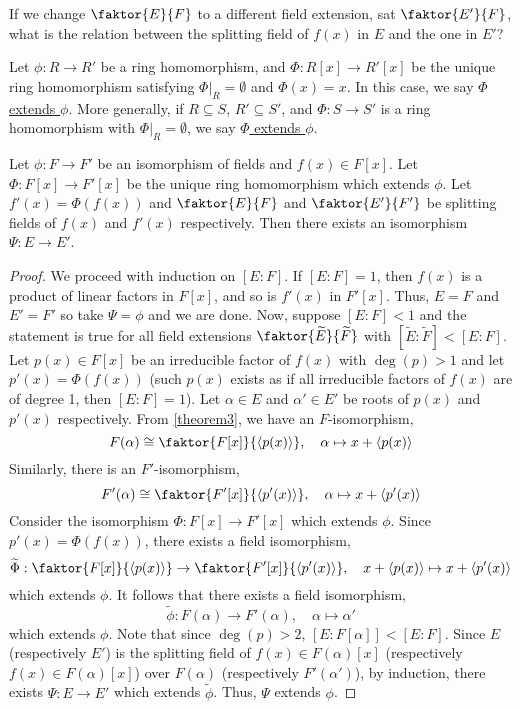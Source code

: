 \documentclass[11pt]{article}
\newcommand{\cyclic}[1]{\left\langle #1 \right\rangle}
\newcommand{\quotient}[2]{\faktor{#1}{#2}}
\begin{document}
If we change $\quotient{E}{F}$ to a different field extension, sat
$\quotient{E'}{F}$, what is the relation between the splitting field of $f(x)$
in $E$ and the one in $E'$?
\begin{definition}
Let $\phi:R\to R'$ be a ring homomorphism, and $\Phi: R[x] \to R'[x]$ be the
unique ring homomorphism satisfying $\Phi \big|_R = \emptyset$ and $\Phi(x) =
x$. In this case, we say \underline{$\Phi$ extends $\phi$}. More generally, if
$R \subseteq S$, $R' \subseteq S'$, and $\Phi: S \to S'$ is a ring homomorphism
with $\Phi \big|_R = \emptyset$, we say \underline{$\Phi$ extends $\phi$}.
\end{definition}
\begin{theorem}
Let $\phi:F \to F'$ be an isomorphism of fields and $f(x) \in F[x]$. Let
$\Phi: F[x] \to F'[x]$ be the unique ring homomorphism which extends $\phi$. Let
$f'(x) = \Phi(f(x))$ and $\quotient{E}{F}$ and $\quotient{E'}{F'}$ be splitting
fields of $f(x)$ and $f'(x)$ respectively. Then there exists an isomorphism
$\Psi:E\to E'$.
\label{theorem13}
\end{theorem}
\begin{proof}
We proceed with induction on $[E:F]$. If $[E:F] = 1$, then $f(x)$ is a product
of linear factors in $F[x]$, and so is $f'(x)$ in $F'[x]$. Thus, $E = F$ and
$E' = F'$ so take $\Psi = \phi$ and we are done. Now, suppose $[E:F] < 1$ and
the statement is true for all field extensions $\quotient{\tilde E}{\tilde F}$
with $[\tilde E: \tilde F]<[E:F]$. Let $p(x) \in F[x]$ be an irreducible factor
of $f(x)$ with $\deg(p)>1$ and let $p'(x) = \Phi(f(x))$ (such $p(x)$ exists as
if all irreducible factors of $f(x)$ are of degree 1, then $[E:F] = 1$). Let
$\alpha \in E$ and $\alpha' \in E'$ be roots of $p(x)$ and $p'(x)$ respectively.
From \cref{theorem3}, we have an $F$-isomorphism,
\begin{equation*}
F(\alpha) \cong \quotient{F[x]}{\cyclic{p(x)}}, \quad \alpha \mapsto x +
\cyclic{p(x)}
\end{equation*}
Similarly, there is an $F'$-isomorphism,
\begin{equation*}
F'(\alpha) \cong \quotient{F'[x]}{\cyclic{p'(x)}}, \quad \alpha \mapsto x +
\cyclic{p'(x)}
\end{equation*}
Consider the isomorphism $\Phi:F[x] \to F'[x]$ which extends $\phi$. Since
$p'(x) = \Phi(f(x))$, there exists a field isomorphism,
\begin{equation*}
\tilde\Phi: \quotient{F[x]}{\cyclic{p(x)}} \to \quotient{F'[x]}{\cyclic{p'(x)}},
\quad x + \cyclic{p(x)} \mapsto  x + \cyclic{p'(x)}
\end{equation*}
which extends $\phi$. It follows that there exists a field isomorphism,
\begin{equation*}
\tilde\phi: F(\alpha) \to F'(\alpha), \quad \alpha \mapsto \alpha'
\end{equation*}
which extends $\phi$. Note that since $\deg(p) > 2$, $[E:F[\alpha]] < [E:F]$.
Since $E$ (respectively $E'$) is the splitting field of $f(x) \in
F(\alpha)[x]$ (respectively $f(x) \in F(\alpha)[x]$) over $F(\alpha)$
(respectively $F'(\alpha')$), by induction, there exists $\Psi:E \to E'$ which
extends $\tilde \phi$. Thus, $\Psi$ extends $\phi$.
\end{proof}
\end{document}
